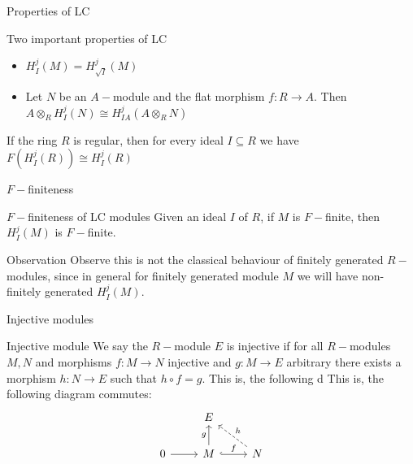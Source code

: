 \documentclass{beamer}
\begin{document}
\begin{frame}[fragile]{Properties of LC}
\begin{block}{Two important properties of LC}
\begin{itemize}
  \item $H^j_I(M) = H^j_{\sqrt{I} }(M)$ 
  \item Let $N$ be an  $A-$module and the flat morphism $f:R\to A$. Then $A\otimes _RH^j_I(N) \cong H_{IA}^j(A\otimes_R N)$
\end{itemize}
\end{block}
\begin{block}{}
 If the ring $R$ is regular, then for every ideal $I\subseteq R$ we have $F(H_I^j(R)) \cong  H_{I}^j(R)$
\end{block}
\end{frame}


\begin{frame}[fragile]{$F-$finiteness}
  \begin{block}{$F-$finiteness of LC modules}
Given an ideal $I$ of $R$, if $M$ is $F-$finite, then  $H^j_I(M)$ is  $F-$finite.
\end{block}
  \begin{block}{Observation}
Observe this is not the classical behaviour of finitely generated $R-$modules, since in general  for finitely generated module $M$ we will have non-finitely generated $H^j_I(M)$.
\end{block}
\end{frame}


\begin{frame}[fragile]{Injective modules}
\begin{block}{Injective module}
We say the $R-$module $E$ is injective if for all $R-$modules $M, N$ and morphisms $f:M\to N$ injective and $g:M\to E$ arbitrary there exists a morphism  $h:N\to E$ such that $h\circ f=g$. This is, the following d This is, the following diagram commutes:
\[\begin{tikzcd}
	& E \\
	0 & M & N
	\arrow[from=2-1, to=2-2]
	\arrow["g", from=2-2, to=1-2]
	\arrow["f", hook, from=2-2, to=2-3]
	\arrow["h"', dashed, from=2-3, to=1-2]
\end{tikzcd}\]
\end{block}
\end{frame}
\end{document}
